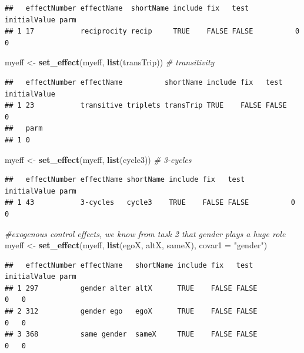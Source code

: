 \documentclass[
]{article}
\newenvironment{Shaded}{\begin{snugshade}}{\end{snugshade}}
\newcommand{\AttributeTok}[1]{\textcolor[rgb]{0.13,0.29,0.53}{#1}}
\newcommand{\CommentTok}[1]{\textcolor[rgb]{0.56,0.35,0.01}{\textit{#1}}}
\newcommand{\FunctionTok}[1]{\textcolor[rgb]{0.13,0.29,0.53}{\textbf{#1}}}
\newcommand{\NormalTok}[1]{#1}
\newcommand{\OtherTok}[1]{\textcolor[rgb]{0.56,0.35,0.01}{#1}}
\newcommand{\StringTok}[1]{\textcolor[rgb]{0.31,0.60,0.02}{#1}}
\begin{document}
\begin{verbatim}
##   effectNumber effectName  shortName include fix   test  initialValue parm
## 1 17           reciprocity recip     TRUE    FALSE FALSE          0   0
\end{verbatim}

\begin{Shaded}
\begin{Highlighting}[]
\NormalTok{myeff }\OtherTok{\textless{}{-}} \FunctionTok{set\_effect}\NormalTok{(myeff, }\FunctionTok{list}\NormalTok{(transTrip))   }\CommentTok{\# transitivity}
\end{Highlighting}
\end{Shaded}

\begin{verbatim}
##   effectNumber effectName          shortName include fix   test  initialValue
## 1 23           transitive triplets transTrip TRUE    FALSE FALSE          0  
##   parm
## 1 0
\end{verbatim}

\begin{Shaded}
\begin{Highlighting}[]
\NormalTok{myeff }\OtherTok{\textless{}{-}} \FunctionTok{set\_effect}\NormalTok{(myeff, }\FunctionTok{list}\NormalTok{(cycle3))      }\CommentTok{\# 3{-}cycles}
\end{Highlighting}
\end{Shaded}

\begin{verbatim}
##   effectNumber effectName shortName include fix   test  initialValue parm
## 1 43           3-cycles   cycle3    TRUE    FALSE FALSE          0   0
\end{verbatim}

\begin{Shaded}
\begin{Highlighting}[]
\CommentTok{\#exogenous control effects, we know from task 2 that gender plays a huge role}
\NormalTok{myeff }\OtherTok{\textless{}{-}} \FunctionTok{set\_effect}\NormalTok{(myeff, }\FunctionTok{list}\NormalTok{(egoX, altX, sameX), }\AttributeTok{covar1 =} \StringTok{"gender"}\NormalTok{)}
\end{Highlighting}
\end{Shaded}

\begin{verbatim}
##   effectNumber effectName   shortName include fix   test  initialValue parm
## 1 297          gender alter altX      TRUE    FALSE FALSE          0   0   
## 2 312          gender ego   egoX      TRUE    FALSE FALSE          0   0   
## 3 368          same gender  sameX     TRUE    FALSE FALSE          0   0
\end{verbatim}
\end{document}

